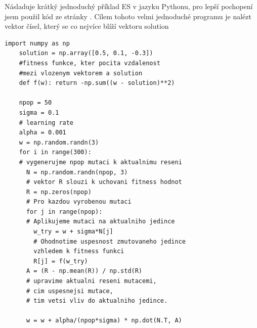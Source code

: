   Násladuje krátký jednoduchý příklad ES v jazyku Pythonu, pro lepší pochopení jsem použil kód ze stránky \citep{openAiEs}. Cílem tohoto velmi jednoduché programu je nalézt vektor čísel, který se co nejvíce blíží vektoru solution
  \lstset{language=Python}
  \begin{lstlisting}[frame=single]  % Start your code-block
    import numpy as np
    solution = np.array([0.5, 0.1, -0.3])
    #fitness funkce, kter pocita vzdalenost
    #mezi vlozenym vektorem a solution 
    def f(w): return -np.sum((w - solution)**2)
    
    npop = 50     
    sigma = 0.1    
    # learning rate
    alpha = 0.001  
    w = np.random.randn(3)
    for i in range(300): 
    # vygenerujme npop mutaci k aktualnimu reseni
      N = np.random.randn(npop, 3) 
      # vektor R slouzi k uchovani fitness hodnot
      R = np.zeros(npop) 
      # Pro kazdou vyrobenou mutaci
      for j in range(npop): 
      # Aplikujeme mutaci na aktualniho jedince
        w_try = w + sigma*N[j]
        # Ohodnotime uspesnost zmutovaneho jedince 
        vzhledem k fitness funkci
        R[j] = f(w_try) 
      A = (R - np.mean(R)) / np.std(R) 
      # upravime aktualni reseni mutacemi, 
      # cim uspesnejsi mutace, 
      # tim vetsi vliv do aktualniho jedince.

      w = w + alpha/(npop*sigma) * np.dot(N.T, A)  
     \end{lstlisting}
